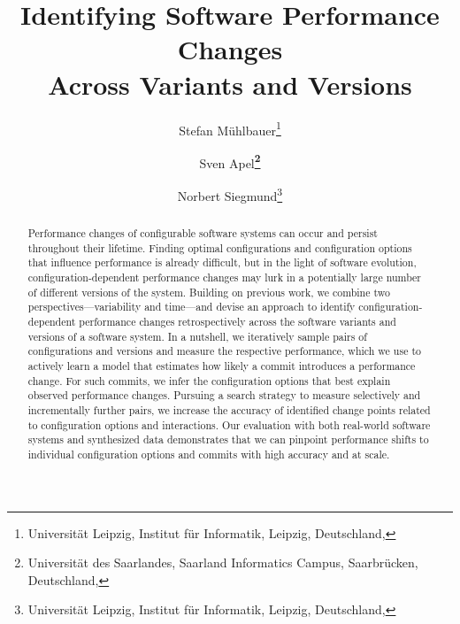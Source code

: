\documentclass[utf8,biblatex]{lni}
\begin{document}
\title[Identifying Software Performance Changes Across Variants and Versions]{Identifying Software Performance Changes\\ Across Variants and Versions}
\author[Stefan Mühlbauer \and Sven Apel \and Norbert Siegmund]
{Stefan Mühlbauer\footnote{Universität Leipzig, Institut für Informatik, Leipzig, Deutschland, } \and
Sven Apel\textbf{\footnote{Universität des Saarlandes, Saarland Informatics Campus, Saarbrücken, Deutschland, }} \and
Norbert Siegmund\footnote{Universität Leipzig, Institut für Informatik, Leipzig, Deutschland, }
}
\maketitle

\begin{abstract}
Performance changes of configurable software systems can occur and persist throughout their lifetime. Finding optimal configurations and configuration options that influence performance is already difficult, but in the light of software evolution, configuration-dependent performance changes may lurk in a potentially large number of different versions of the system. Building on previous work, we combine two perspectives---variability and time---and devise an approach to identify configuration-dependent performance changes retrospectively across the software variants and versions of a software system. In a nutshell, we iteratively sample pairs of configurations and versions and measure the respective performance, which we use to actively learn a model that estimates how likely a commit introduces a performance change. For such commits, we infer the configuration options that best explain observed performance changes. Pursuing a search strategy to measure selectively and incrementally further pairs, we increase the accuracy of identified change points related to configuration options and interactions. Our evaluation with both real-world software systems and synthesized data demonstrates that we can pinpoint performance shifts to individual configuration options and commits with high accuracy and at scale.
\end{abstract}
\end{document}
